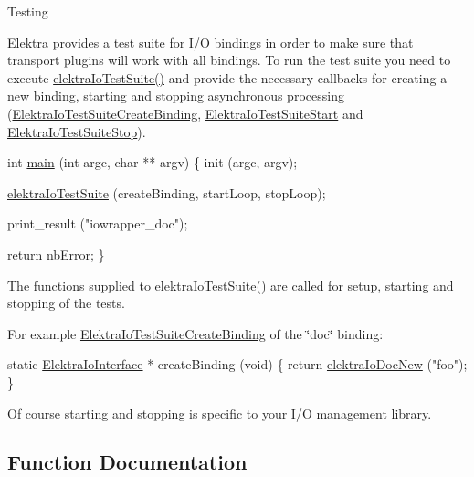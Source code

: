 \begin{DoxyParagraph}{Testing}

\end{DoxyParagraph}
Elektra provides a test suite for I/O bindings in order to make sure that transport plugins will work with all bindings. To run the test suite you need to execute \hyperlink{kdbiotest_8h_afe747efa9fd4b15b6c212ae7e1c51eb6}{elektra\+Io\+Test\+Suite()} and provide the necessary callbacks for creating a new binding, starting and stopping asynchronous processing (\hyperlink{kdbiotest_8h_a34b00a39be5b3f0a15959cda384e33dc}{Elektra\+Io\+Test\+Suite\+Create\+Binding}, \hyperlink{kdbiotest_8h_adc6ce3b9abbedf6ce56a5b0167d01286}{Elektra\+Io\+Test\+Suite\+Start} and \hyperlink{kdbiotest_8h_a0f56c00b010605d876c22d0c7a49aa0c}{Elektra\+Io\+Test\+Suite\+Stop}).


\begin{DoxyCodeInclude}
\textcolor{keywordtype}{int} \hyperlink{testio__doc_8c_a3c04138a5bfe5d72780bb7e82a18e627}{main} (\textcolor{keywordtype}{int} argc, \textcolor{keywordtype}{char} ** argv)
\{
        init (argc, argv);

        \hyperlink{kdbiotest_8h_afe747efa9fd4b15b6c212ae7e1c51eb6}{elektraIoTestSuite} (createBinding, startLoop, stopLoop);

        print\_result (\textcolor{stringliteral}{"iowrapper\_doc"});

        \textcolor{keywordflow}{return} nbError;
\}
\end{DoxyCodeInclude}
 The functions supplied to \hyperlink{kdbiotest_8h_afe747efa9fd4b15b6c212ae7e1c51eb6}{elektra\+Io\+Test\+Suite()} are called for setup, starting and stopping of the tests.

For example \hyperlink{kdbiotest_8h_a34b00a39be5b3f0a15959cda384e33dc}{Elektra\+Io\+Test\+Suite\+Create\+Binding} of the \char`\"{}doc\char`\"{} binding\+:


\begin{DoxyCodeInclude}
\textcolor{keyword}{static} \hyperlink{kdbio_8h_aabcd87b8c09d4d4c1033fc1baa417391}{ElektraIoInterface} * createBinding (\textcolor{keywordtype}{void})
\{
        \textcolor{keywordflow}{return} \hyperlink{io__doc_8c_af4bd586146acfbb1c1324483b79f0cc3}{elektraIoDocNew} (\textcolor{stringliteral}{"foo"});
\}
\end{DoxyCodeInclude}
 Of course starting and stopping is specific to your I/O management library. 

\subsection{Function Documentation}
\mbox{\label{group__kdbio_ga187345483bdfbb404919c6797bc2db77}} 
